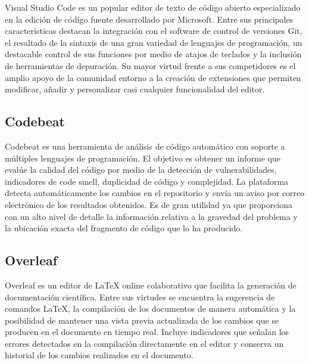 Visual Studio Code \cite{tech:vscode} es un popular editor de texto de código abierto especializado en la edición de código fuente desarrollado por Microsoft. Entre sus principales características destacan la integración con el software de control de versiones Git, el resaltado de la sintaxis de una gran variedad de lenguajes de programación, un destacable control de sus funciones por medio de atajos de teclados y la inclusión de herramientas de depuración. Su mayor virtud frente a sus competidores es el amplio apoyo de la comunidad entorno a la creación de extensiones que permiten modificar, añadir y personalizar casi cualquier funcionalidad del editor.

\subsection{Codebeat}

Codebeat \cite{tech:codebeat} es una herramienta de análisis de código automático con soporte a múltiples lenguajes de programación. El objetivo es obtener un informe que evalúe la calidad del código por medio de la detección de vulnerabilidades, indicadores de code smell, duplicidad de código y complejidad. La plataforma detecta automáticamente los cambios en el repositorio y envía un aviso por correo electrónico de los resultados obtenidos. Es de gran utilidad ya que proporciona con un alto nivel de detalle la información relativa a la gravedad del problema y la ubicación exacta del fragmento de código que lo ha producido.

\subsection{Overleaf}

Overleaf \cite{tech:overleaf} es un editor de LaTeX online colaborativo que facilita la generación de documentación científica. Entre sus virtudes se encuentra la sugerencia de comandos LaTeX, la compilación de los documentos de manera automática y la posibilidad de mantener una vista previa actualizada de los cambios que se producen en el documento en tiempo real. Incluye indicadores que señalan los errores detectados en la compilación directamente en el editor y conserva un historial de los cambios realizados en el documento.
